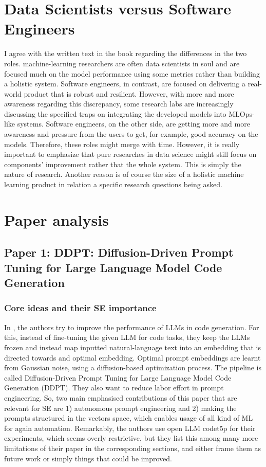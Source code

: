 \documentclass[a4paper,10pt]{article} %
\begin{document}
\section{Data Scientists versus Software Engineers}


I agree with the written text in the book regarding the differences in the two roles. machine-learning researchers are often data scientists in soul and are focused much on the model performance using some metrics rather than building a holistic system. Software engineers, in contrast, are focused on delivering a real-world product that is robust and resilient. However, with more and more awareness regarding this discrepancy, some research labs are increasingly discussing the specified traps on integrating the developed models into MLOps-like systems. Software engineers, on the other side, are getting more and more awareness and pressure from the users to get, for example, good accuracy on the models. Therefore, these roles might merge with time. However, it is really important to emphasize that pure researches in data science might still focus on components' improvement rather that the whole system. This is simply the nature of research. Another reason is of course the size of a holistic machine learning product in relation a specific research questions being asked.

\section{Paper analysis}

\subsection{Paper 1: DDPT: Diffusion-Driven Prompt Tuning for Large Language Model Code Generation}

\subsubsection{Core ideas and their SE importance}

In \cite{li2025ddpt}, the authors try to improve the performance of LLMs in code generation.
For this, instead of fine-tuning the given LLM for code tasks, they keep the LLMs frozen and instead map inputted natural-language text into an embedding that is directed towards and optimal embedding.
Optimal prompt embeddings are learnt from Gaussian noise, using a diffusion-based optimization process.
The pipeline is called Diffusion-Driven Prompt Tuning for Large Language Model Code Generation (DDPT).
They also want to reduce labor effort in prompt engineering.
So, two main emphasised contributions of this paper that are relevant for SE are 1) autonomous prompt engineering and 2) making the prompts structured in the vectors space, which enables usage of all kind of ML for again automation.
Remarkably, the authors use open LLM codet5p for their experiments, which seems overly restrictive, but they list this among many more limitations of their paper in the corresponding sections, and either frame them as future work or simply things that could be improved.
\end{document}
